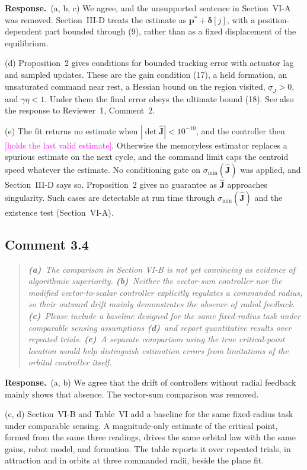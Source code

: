 \documentclass[10pt]{article}
\newcommand{\open}[1]{\textcolor{magenta}{[#1]}}     %
\newcommand{\resp}{\par\textbf{Response.}~}
\begin{document}
\resp (a, b, c) We agree, and the unsupported sentence in Section~VI-A was removed. Section~III-D treats the estimate as $\mathbf{p}^* + \boldsymbol{\delta}[j]$, with a position-dependent part bounded through (9), rather than as a fixed displacement of the equilibrium.

(d) Proposition~2 gives conditions for bounded tracking error with actuator lag and sampled updates. These are the gain condition (17), a held formation, an unsaturated command near rest, a Hessian bound on the region visited, $\underline{\sigma}_J > 0$, and $\gamma\eta < 1$. Under them the final error obeys the ultimate bound (18). See also the response to Reviewer~1, Comment~2.

(e) The fit returns no estimate when $|\det\hat{\mathbf{J}}| < 10^{-10}$, and the controller then \open{holds the last valid estimate}. Otherwise the memoryless estimator replaces a spurious estimate on the next cycle, and the command limit caps the centroid speed whatever the estimate. No conditioning gate on $\sigma_{\min}(\hat{\mathbf{J}})$ was applied, and Section~III-D says so. Proposition~2 gives no guarantee as $\hat{\mathbf{J}}$ approaches singularity. Such cases are detectable at run time through $\sigma_{\min}(\hat{\mathbf{J}})$ and the existence test (Section~VI-A).

\subsection*{Comment 3.4}

\begin{quote}\itshape
\textbf{(a)}~The comparison in Section VI-B is not yet convincing as evidence of algorithmic superiority.
\textbf{(b)}~Neither the vector-sum controller nor the modified vector-to-scalar controller explicitly regulates a commanded radius, so their outward drift mainly demonstrates the absence of radial feedback.
\textbf{(c)}~Please include a baseline designed for the same fixed-radius task under comparable sensing assumptions
\textbf{(d)}~and report quantitative results over repeated trials.
\textbf{(e)}~A separate comparison using the true critical-point location would help distinguish estimation errors from limitations of the orbital controller itself.
\end{quote}


\resp (a, b) We agree that the drift of controllers without radial feedback mainly shows that absence. The vector-sum comparison was removed.

(c, d) Section~VI-B and Table~VI add a baseline for the same fixed-radius task under comparable sensing. A magnitude-only estimate of the critical point, formed from the same three readings, drives the same orbital law with the same gains, robot model, and formation. The table reports it over repeated trials, in attraction and in orbits at three commanded radii, beside the plane fit.
\end{document}
